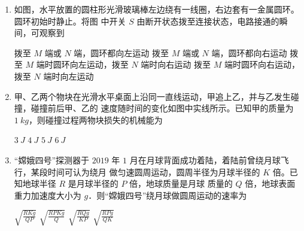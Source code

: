 

\gaokaoxz
\begin{enumerate}
\item
如图，水平放置的圆柱形光滑玻璃棒左边绕有一线圈，右边套有一金属圆环。圆环初始时静止。将图
中开关 $ S $ 由断开状态拨至连接状态，电路接通的瞬间，可观察到  
\begin{figure}[h!]
\centering

\end{figure}


\fourchoices
{拨至 $ M $ 端或 $ N $ 端，圆环都向左运动}
{拨至 $ M $ 端或 $ N $ 端，圆环都向右运动}
{拨至 $ M $ 端时圆环向左运动，拨至 $ N $ 端时向右运动}
{拨至 $ M $ 端时圆环向右运动，拨至 $ N $ 端时向左运动}


\item
甲、乙两个物块在光滑水平桌面上沿同一直线运动，甲追上乙，并与乙发生碰撞，碰撞前后甲、乙的
速度随时间的变化如图中实线所示。已知甲的质量为 $ 1 \ kg $，则碰撞过程两物块损失的机械能为  
\begin{figure}[h!]
\centering

\end{figure}


\fourchoices
{$ 3 \ J $}
{$ 4 \ J $}
{$ 5 \ J $}
{$ 6 \ J $}


\item
“嫦娥四号”探测器于 $ 2019 $ 年 $ 1 $ 月在月球背面成功着陆，着陆前曾绕月球飞行，某段时间可认为绕月
做匀速圆周运动，圆周半径为月球半径的 $ K $ 倍。已知地球半径 $ R $ 是月球半径的 $ P $ 倍，地球质量是月球
质量的 $ Q $ 倍，地球表面重力加速度大小为 $ g $．则“嫦娥四号”绕月球做圆周运动的速率为  

\fourchoices
{$\sqrt{\frac{R K g}{Q P}}$}
{$\sqrt{\frac{R P K g}{Q}}$}
{$ \sqrt{\frac{R Q g}{K P}}$}
{$\sqrt{\frac{R P g}{Q K}}$}









\end{enumerate}
